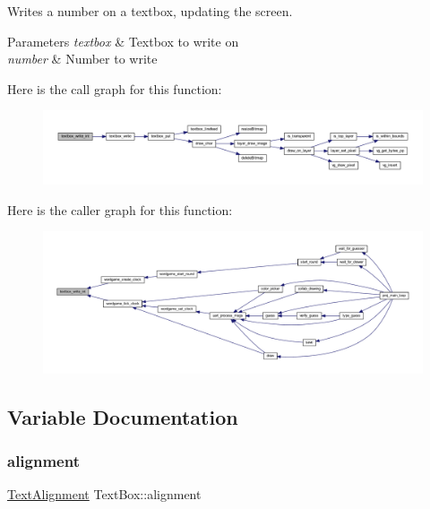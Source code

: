Writes a number on a textbox, updating the screen. 


\begin{DoxyParams}{Parameters}
{\em textbox} & Textbox to write on \\
\hline
{\em number} & Number to write \\
\hline
\end{DoxyParams}
Here is the call graph for this function\+:\nopagebreak
\begin{figure}[H]
\begin{center}
\leavevmode
\includegraphics[width=350pt]{group__textbox_ga6a60cec4ef24e6e154b93aa81af2b988_cgraph}
\end{center}
\end{figure}
Here is the caller graph for this function\+:\nopagebreak
\begin{figure}[H]
\begin{center}
\leavevmode
\includegraphics[width=350pt]{group__textbox_ga6a60cec4ef24e6e154b93aa81af2b988_icgraph}
\end{center}
\end{figure}


\subsection{Variable Documentation}
\mbox{\label{group__textbox_gaf8595fd6bcd01e16bbaab3da5474c2ed}} 
\subsubsection{\texorpdfstring{alignment}{alignment}}
{\footnotesize\ttfamily \mbox{\hyperlink{group__textbox_gaa56f1a82069b5feeadbb4591cb3e474f}{Text\+Alignment}} Text\+Box\+::alignment}



